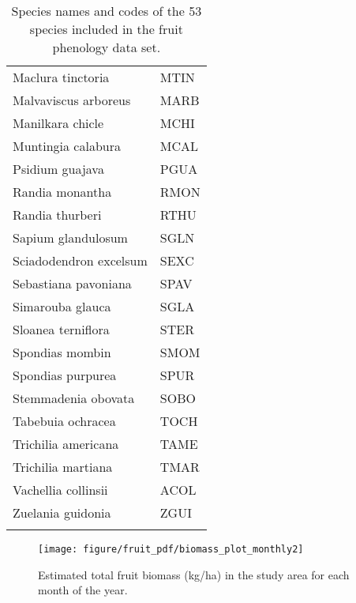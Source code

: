 \documentclass{article}\usepackage[]{graphicx}\usepackage[]{color}
\newenvironment{knitrout}{}{} %
\begin{document}
\begin{longtable}{ll}
  Maclura tinctoria & MTIN \\ 
  Malvaviscus arboreus & MARB \\ 
  Manilkara chicle & MCHI \\ 
  Muntingia calabura & MCAL \\ 
  Psidium guajava & PGUA \\ 
  Randia monantha & RMON \\ 
  Randia thurberi & RTHU \\ 
  Sapium glandulosum & SGLN \\ 
  Sciadodendron excelsum & SEXC \\ 
  Sebastiana pavoniana & SPAV \\ 
  Simarouba glauca & SGLA \\ 
  Sloanea terniflora & STER \\ 
  Spondias mombin & SMOM \\ 
  Spondias purpurea & SPUR \\ 
  Stemmadenia obovata & SOBO \\ 
  Tabebuia ochracea & TOCH \\ 
  Trichilia americana & TAME \\ 
  Trichilia martiana & TMAR \\ 
  Vachellia collinsii & ACOL \\ 
  Zuelania guidonia & ZGUI \\ 
   \hline
\hline
\caption{Species names and codes of the 53 species included in the fruit phenology data set.} 
\end{longtable}






























\begin{figure}
\begin{knitrout}
\color{fgcolor}

{\centering \texttt{[image: figure/fruit\_pdf/biomass\_plot\_monthly2]} 

}



\end{knitrout}

\caption{Estimated total fruit biomass (kg/ha) in the study area for each month of the year.}
\end{figure}
\end{document}
